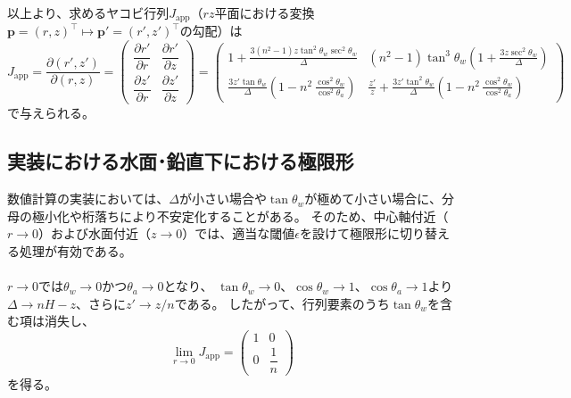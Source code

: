 \vspace{1em}
以上より、求めるヤコビ行列$J_{\mathrm{app}}$（$rz$平面における変換$\bm{p}=(r,z)^\top \mapsto \bm{p}'=(r',z')^\top$の勾配）は
\begin{equation}\label{eq:Jacobian-app-matrix}
  J_{\mathrm{app}} = \frac{\partial (r', z')}{\partial (r, z)}
  =
  \begin{pmatrix}
    \dfrac{\partial r'}{\partial r} & \dfrac{\partial r'}{\partial z} \\[1.2em]
    \dfrac{\partial z'}{\partial r} & \dfrac{\partial z'}{\partial z}
  \end{pmatrix}
  =
  \begin{pmatrix}
    \displaystyle 1 + \frac{3(n^2 - 1) z \tan^2 \theta_w \sec^2 \theta_w}{\Delta}
    &
    \displaystyle (n^2 - 1) \tan^3 \theta_w \left( 1 + \frac{3 z \sec^2 \theta_w}{\Delta} \right)
    \\[1.5em]
    \displaystyle \frac{3 z' \tan \theta_w}{\Delta} \left( 1 - n^2 \, \frac{\cos^2 \theta_w}{\cos^2 \theta_a} \right)
    &
    \displaystyle \frac{z'}{z} + \frac{3 z' \tan^2 \theta_w}{\Delta} \left( 1 - n^2 \, \frac{\cos^2 \theta_w}{\cos^2 \theta_a} \right)
  \end{pmatrix}
\end{equation}
で与えられる。

\subsection{実装における水面･鉛直下における極限形}
\label{sec:appendix-jacobian-limit}

数値計算の実装においては、$\Delta$が小さい場合や$\tan\theta_w$が極めて小さい場合に、分母の極小化や桁落ちにより不安定化することがある。
そのため、中心軸付近（$r\to 0$）および水面付近（$z\to 0$）では、適当な閾値$\epsilon$を設けて極限形に切り替える処理が有効である。

\paragraph{}
$r\to 0$では$\theta_w\to 0$かつ$\theta_a\to 0$となり、
$\tan\theta_w\to 0$、$\cos\theta_w\to 1$、$\cos\theta_a\to 1$より$\Delta\to nH-z$、さらに$z'\to z/n$である。
したがって、行列要素のうち$\tan\theta_w$を含む項は消失し、
\begin{equation}\label{eq:Jacobian-app-r0}
  \lim_{r\to 0} J_{\mathrm{app}}
  =
  \begin{pmatrix}
    1 & 0 \\
    0 & \dfrac{1}{n}
  \end{pmatrix}
\end{equation}
を得る。

